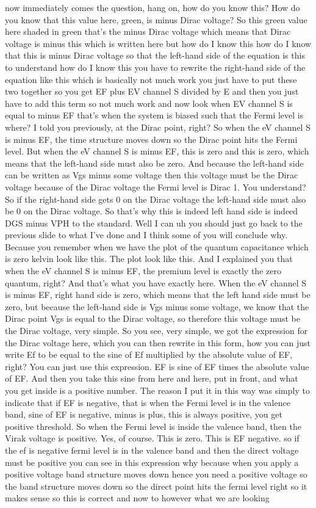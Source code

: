 now immediately comes the question, hang on, how do you know this? How do you know that this value here, green, is minus Dirac voltage? So this green value here shaded in green that's the minus Dirac voltage which means that Dirac voltage is minus this which is written here but how do I know this how do I know that this is minus Dirac voltage so that the left-hand side of the equation is this to understand how do I know this you have to rewrite the right-hand side of the equation like this which is basically not much work you just have to put these two together so you get EF plus EV channel S divided by E and then you just have to add this term so not much work and now look when EV channel S is equal to minus EF that's when the system is biased such that the Fermi level is where? I told you previously, at the Dirac point, right? So when the eV channel S is minus EF, the time structure moves down so the Dirac point hits the Fermi level. But when the eV channel S is minus EF, this is zero and this is zero, which means that the left-hand side must also be zero. And because the left-hand side can be written as Vgs minus some voltage then this voltage must be the Dirac voltage because of the Dirac voltage the Fermi level is Dirac 1. You understand? So if the right-hand side gets 0 on the Dirac voltage the left-hand side must also be 0 on the Dirac voltage. So that's why this is indeed left hand side is indeed DGS minus VPH to the standard. Well I can uh you should just go back to the previous slide to what I've done and I think some of you will conclude why. Because you remember when we have the plot of the quantum capacitance which is zero kelvin look like this. The plot look like this. And I explained you that when the eV channel S is minus EF, the premium level is exactly the zero quantum, right? And that's what you have exactly here. When the eV channel S is minus EF, right hand side is zero, which means that the left hand side must be zero, but because the left-hand side is Vgs minus some voltage, we know that the Dirac point Vgs is equal to the Dirac voltage, so therefore this voltage must be the Dirac voltage, very simple. So you see, very simple, we got the expression for the Dirac voltage here, which you can then rewrite in this form, how you can just write Ef to be equal to the sine of Ef multiplied by the absolute value of EF, right? You can just use this expression. EF is sine of EF times the absolute value of EF. And then you take this sine from here and here, put in front, and what you get inside is a positive number. The reason I put it in this way was simply to indicate that if EF is negative, that is when the Fermi level is in the valence band, sine of EF is negative, minus is plus, this is always positive, you get positive threshold. So when the Fermi level is inside the valence band, then the Virak voltage is positive. Yes, of course. This is zero. This is EF negative. so if the ef is negative fermi level is in the valence band and then the direct voltage must be positive you can see in this expression why because when you apply a positive voltage band structure moves down hence you need a positive voltage so the band structure moves down so the direct point hits the fermi level right so it makes sense so this is correct and now to however what we are looking 